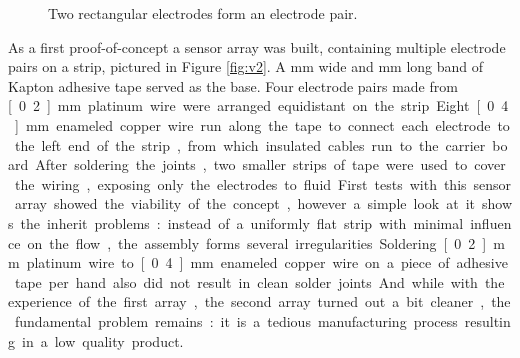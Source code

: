 \begin{figure}[H]
	\begin{center}
		\caption{Two rectangular electrodes form an electrode pair.}
		\label{fig:sensor}
	\end{center}
\end{figure}

As a first proof-of-concept a sensor array was built, containing multiple electrode pairs on a strip, pictured in Figure \ref{fig:v2}. A \unit[50]{mm} wide and \unit[250]{mm} long band of Kapton adhesive tape served as the base. Four electrode pairs made from \unit[0.2]{mm} platinum wire were arranged equidistant on the strip. Eight \unit[0.4]{mm} enameled copper wire run along the tape to connect each electrode to the left end of the strip, from which insulated cables run to the carrier board. After soldering the joints, two smaller strips of tape were used to cover the wiring, exposing only the electrodes to fluid.

First tests with this sensor array showed the viability of the concept, however a simple look at it shows the inherit problems: instead of a uniformly flat strip with minimal influence on the flow, the assembly forms several irregularities. Soldering \unit[0.2]{mm} platinum wire to \unit[0.4]{mm} enameled copper wire on a piece of adhesive tape per hand also did not result in clean solder joints. And while with the experience of the first array, the second array turned out a bit cleaner, the fundamental problem remains: it is a tedious manufacturing process resulting in a low quality product.

